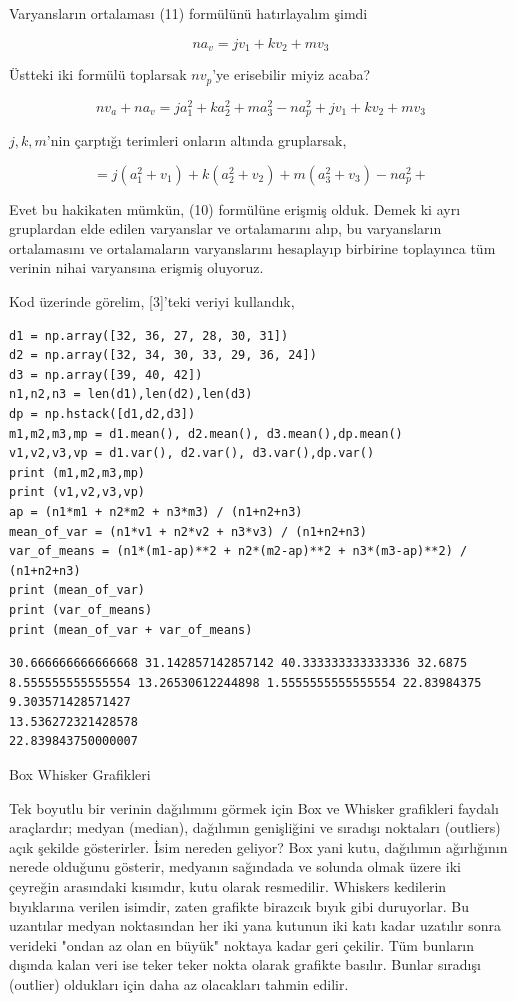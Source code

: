 \documentclass[12pt,fleqn]{article}\usepackage{../../common}
\begin{document}
Varyansların ortalaması (11) formülünü hatırlayalım şimdi

$$
n a_v = j v_1 + k v_2 + m v_3
$$

Üstteki iki formülü toplarsak $n v_p$'ye erisebilir miyiz acaba?

$$
n v_a + n a_v = 
j a_1^2 + k a_2^2 + m a_3^2 - n a_p^2 +
j v_1 + k v_2 + m v_3
$$

$j,k,m$'nin çarptığı terimleri onların altında gruplarsak,

$$
=  j (a_1^2 + v_1) + k (a_2^2 + v_2) + m (a_3^2 + v_3) - n a_p^2 +
$$

Evet bu hakikaten mümkün, (10) formülüne erişmiş olduk. Demek ki ayrı gruplardan
elde edilen varyanslar ve ortalamarını alıp, bu varyansların ortalamasını ve
ortalamaların varyanslarını hesaplayıp birbirine toplayınca tüm verinin
nihai varyansına erişmiş oluyoruz.

Kod üzerinde görelim, [3]'teki veriyi kullandık,

\begin{verbatim}
d1 = np.array([32, 36, 27, 28, 30, 31])
d2 = np.array([32, 34, 30, 33, 29, 36, 24])
d3 = np.array([39, 40, 42])
n1,n2,n3 = len(d1),len(d2),len(d3)
dp = np.hstack([d1,d2,d3])
m1,m2,m3,mp = d1.mean(), d2.mean(), d3.mean(),dp.mean()
v1,v2,v3,vp = d1.var(), d2.var(), d3.var(),dp.var()
print (m1,m2,m3,mp)
print (v1,v2,v3,vp)
ap = (n1*m1 + n2*m2 + n3*m3) / (n1+n2+n3) 
mean_of_var = (n1*v1 + n2*v2 + n3*v3) / (n1+n2+n3) 
var_of_means = (n1*(m1-ap)**2 + n2*(m2-ap)**2 + n3*(m3-ap)**2) / (n1+n2+n3)
print (mean_of_var)
print (var_of_means)
print (mean_of_var + var_of_means)
\end{verbatim}

\begin{verbatim}
30.666666666666668 31.142857142857142 40.333333333333336 32.6875
8.555555555555554 13.26530612244898 1.5555555555555554 22.83984375
9.303571428571427
13.536272321428578
22.839843750000007
\end{verbatim}

Box Whisker Grafikleri

Tek boyutlu bir verinin dağılımını görmek için Box ve Whisker grafikleri
faydalı araçlardır; medyan (median), dağılımın genişliğini ve sıradışı
noktaları (outliers) açık şekilde gösterirler. İsim nereden geliyor? Box
yani kutu, dağılımın ağırlığının nerede olduğunu gösterir, medyanın
sağındada ve solunda olmak üzere iki çeyreğin arasındaki kısımdır, kutu
olarak resmedilir. Whiskers kedilerin bıyıklarına verilen isimdir, zaten
grafikte birazcık bıyık gibi duruyorlar. Bu uzantılar medyan noktasından
her iki yana kutunun iki katı kadar uzatılır sonra verideki "ondan az olan
en büyük" noktaya kadar geri çekilir. Tüm bunların dışında kalan veri ise
teker teker nokta olarak grafikte basılır. Bunlar sıradışı (outlier)
oldukları için daha az olacakları tahmin edilir.
\end{document}
